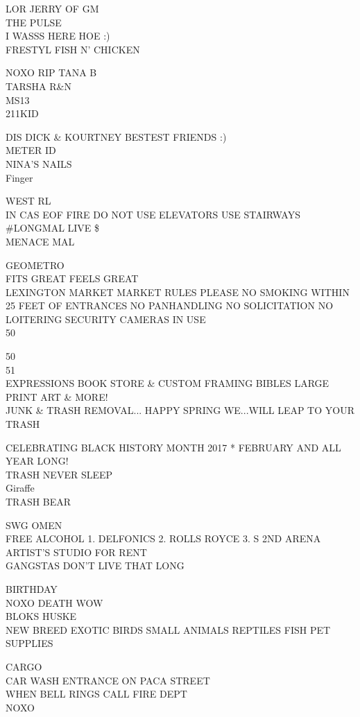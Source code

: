 \documentclass[10pt,letterpaper]{article}
\begin{document}
LOR JERRY OF GM\\
THE PULSE\\
I WASSS HERE HOE :)\\
FRESTYL FISH N' CHICKEN

NOXO RIP TANA B\\
TARSHA R\&N\\
MS13\\
211KID

DIS DICK \& KOURTNEY BESTEST FRIENDS :)\\
METER ID\\
NINA'S NAILS\\
Finger

WEST RL\\
IN CAS EOF FIRE DO NOT USE ELEVATORS USE STAIRWAYS\\
\#LONGMAL LIVE \$\\
MENACE MAL

GEOMETRO\\
FITS GREAT FEELS GREAT\\
LEXINGTON MARKET MARKET RULES PLEASE NO SMOKING WITHIN 25 FEET OF ENTRANCES NO PANHANDLING NO SOLICITATION NO LOITERING SECURITY CAMERAS IN USE\\
50

50\\
51\\
EXPRESSIONS BOOK STORE \& CUSTOM FRAMING BIBLES LARGE PRINT ART \& MORE!\\
JUNK \& TRASH REMOVAL... HAPPY SPRING WE...WILL LEAP TO YOUR TRASH

CELEBRATING BLACK HISTORY MONTH 2017 * FEBRUARY AND ALL YEAR LONG!\\
TRASH NEVER SLEEP\\
Giraffe\\
TRASH BEAR

SWG OMEN\\
FREE ALCOHOL 1. DELFONICS 2. ROLLS ROYCE 3. S 2ND ARENA\\
ARTIST'S STUDIO FOR RENT\\
GANGSTAS DON'T LIVE THAT LONG

BIRTHDAY\\
NOXO DEATH WOW\\
BLOKS HUSKE\\
NEW BREED EXOTIC BIRDS SMALL ANIMALS REPTILES FISH PET SUPPLIES

CARGO\\
CAR WASH ENTRANCE ON PACA STREET\\
WHEN BELL RINGS CALL FIRE DEPT\\
NOXO
\end{document}
